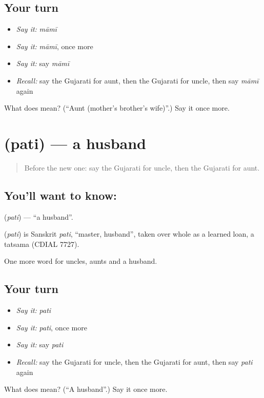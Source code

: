\subsection*{Your turn}
\begin{itemize}
\raggedright
  \item \emph{Say it:} \emph{māmī}
  \item \emph{Say it:} \emph{māmī}, once more
  \item \emph{Say it:} say \emph{māmī}
  \item \emph{Recall:} say the Gujarati for aunt, then the Gujarati for uncle, then say \emph{māmī} again
\end{itemize}

\begin{tcolorbox}[breakable,colback=teal!4,colframe=teal!35!black,title={Before you move on}]
What does  mean? (\textquotedblleft{}Aunt (mother's brother's wife)\textquotedblright{}.) Say it once more.
\end{tcolorbox}
\section[\texorpdfstring{\gu{પતિ} (pati)}{પતિ (pati)}]{ (pati) — a husband}

\label{lesson:GU-C52-husband}



\begin{quote}
Before the new one: say the Gujarati for uncle, then the Gujarati for aunt.
\end{quote}

\subsection*{You'll want to know: }
\textbf{} (\emph{pati}) — \textquotedblleft{}a husband\textquotedblright{}.

\begin{cousinweb}
\textbf{} (\emph{pati}) is Sanskrit \emph{pati}, \textquotedblleft{}master, husband\textquotedblright{}, taken over whole as a learned loan, a tatsama (CDIAL 7727).
\end{cousinweb}

\begin{grammarlens}[title={What you've built}]
One more word for uncles, aunts and a husband.
\end{grammarlens}

\subsection*{Your turn}
\begin{itemize}
\raggedright
  \item \emph{Say it:} \emph{pati}
  \item \emph{Say it:} \emph{pati}, once more
  \item \emph{Say it:} say \emph{pati}
  \item \emph{Recall:} say the Gujarati for uncle, then the Gujarati for aunt, then say \emph{pati} again
\end{itemize}

\begin{tcolorbox}[breakable,colback=teal!4,colframe=teal!35!black,title={Before you move on}]
What does  mean? (\textquotedblleft{}A husband\textquotedblright{}.) Say it once more.
\end{tcolorbox}
